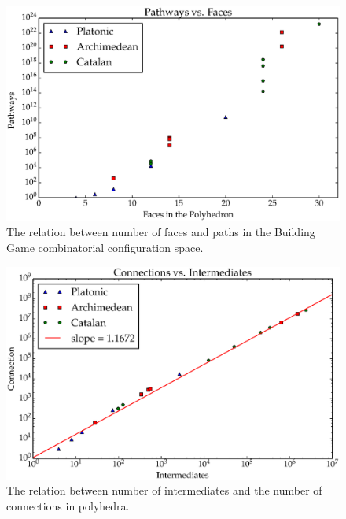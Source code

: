 \begin{figure}[ht]
\includegraphics[scale=0.6, angle=0]{images/polys_face_path.eps}
\caption{The relation between number of faces and paths in the Building Game combinatorial configuration space.}
\label{fig:FacPath}
\end{figure}

\begin{figure}[ht]
\centering
\includegraphics[scale=0.6, angle=0]{images/polys_int_con.eps}
\caption{The relation between number of intermediates and the number of connections in polyhedra.}
\label{fig:IntCons}
\end{figure}


